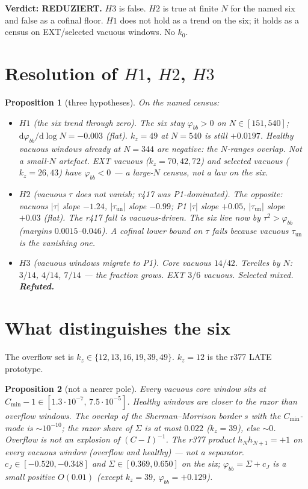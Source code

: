 \documentclass[11pt]{article}
\newtheorem{prop}{Proposition}
\theoremstyle{remark}
\newcommand{\phibb}{\varphi_{bb}}
\begin{document}
\noindent
\textbf{Verdict: REDUZIERT.}
$H3$ is false.
$H2$ is true at finite $N$ for the named six and false
as a cofinal floor.
$H1$ does not hold as a trend on the six; it holds as a
census on EXT/selected vacuous windows.
No $k_{0}$.

\section{Resolution of $H1$, $H2$, $H3$}\label{sec:H}

\begin{prop}[three hypotheses]\label{prop:H}
On the named census:
\begin{itemize}
\item $H1$ (the six trend through zero).
The six stay $\phibb>0$ on $N\in[151,540]$;
$\mathrm{d}\phibb/\mathrm{d}\log N=-0.003$ (flat).
$k_{z}=49$ at $N=540$ is still $+0.0197$.
Healthy vacuous windows already at $N=344$ are negative:
the $N$-ranges overlap.  Not a small-$N$ artefact.
EXT vacuous ($k_{z}=70,42,72$) and selected vacuous
($k_{z}=26,43$) have $\phibb<0$ --- a large-$N$ census,
not a law on the six.
\item $H2$ (vacuous $\tau$ does not vanish; r417 was
P1-dominated).
The opposite: vacuous $|\tau|$ slope $-1.24$,
$|\tau_{\mathrm{un}}|$ slope $-0.99$;
P1 $|\tau|$ slope $+0.05$, $|\tau_{\mathrm{un}}|$ slope
$+0.03$ (flat).
The r417 fall is \emph{vacuous-driven}.
The six live now by $\tau^{2}>\phibb$
(margins $0.0015$--$0.046$).
A cofinal lower bound on $\tau$ fails because
vacuous $\tau_{\mathrm{un}}$ is the vanishing one.
\item $H3$ (vacuous windows migrate to P1).
Core vacuous $14/42$.  Terciles by $N$:
$3/14$, $4/14$, $7/14$ --- the fraction \emph{grows}.
EXT $3/6$ vacuous.  Selected mixed.
\textbf{Refuted.}
\end{itemize}
\end{prop}

\section{What distinguishes the six}\label{sec:char}

The overflow set is
$k_{z}\in\{12,13,16,19,39,49\}$.
$k_{z}=12$ is the r377 LATE prototype.

\begin{prop}[not a nearer pole]\label{prop:razor}
Every vacuous core window sits at
$C_{\min}-1\in[1.3\cdot 10^{-7},\,7.5\cdot 10^{-5}]$.
Healthy windows are \emph{closer} to the razor than
overflow windows.
The overlap of the Sherman--Morrison border $s$ with the
$C_{\min}$-mode is $\sim 10^{-10}$; the razor share of
$\Sigma$ is at most $0.022$ ($k_{z}=39$), else $\sim 0$.
Overflow is not an explosion of $(C-I)^{-1}$.
The r377 product $h_{N}h_{N+1}=+1$ on every vacuous
window (overflow and healthy) --- not a separator.
$c_{J}\in[-0.520,-0.348]$ and $\Sigma\in[0.369,0.650]$
on the six; $\phibb=\Sigma+c_{J}$ is a small positive
$O(0.01)$ (except $k_{z}=39$, $\phibb=+0.129$).
\end{prop}
\end{document}

